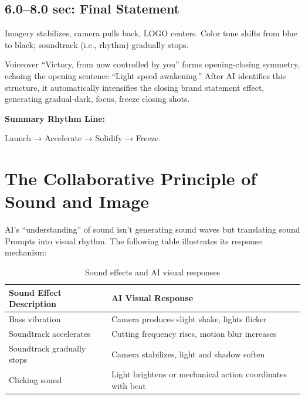 \subsection{6.0--8.0 sec: Final Statement}
\label{subsec:final-statement}

Imagery stabilizes, camera pulls back, LOGO centers. Color tone shifts from blue to black; soundtrack (i.e., rhythm) gradually stops.

Voiceover ``Victory, from now controlled by you'' forms opening-closing symmetry, echoing the opening sentence ``Light speed awakening.'' After AI identifies this structure, it automatically intensifies the closing brand statement effect, generating gradual-dark, focus, freeze closing shots.

\textbf{Summary Rhythm Line:}

\begin{Prompt}
Launch → Accelerate → Solidify → Freeze.
\end{Prompt}

\section{The Collaborative Principle of Sound and Image}
\label{sec:sound-image-collaboration}

AI's ``understanding'' of sound isn't generating sound waves but translating sound Prompts into visual rhythm. The following table illustrates its response mechanism:

\begin{table}[H]
\centering
\caption{Sound effects and AI visual responses \\ \authorillustration}
\label{tab:sound-visual}
\begin{tabular}{ll}
\hline
\textbf{Sound Effect Description} & \textbf{AI Visual Response} \\
\hline
Bass vibration & Camera produces slight shake, lights flicker \\
Soundtrack accelerates & Cutting frequency rises, motion blur increases \\
Soundtrack gradually stops & Camera stabilizes, light and shadow soften \\
Clicking sound & Light brightens or mechanical action coordinates with beat \\
\hline
\end{tabular}
\end{table}

